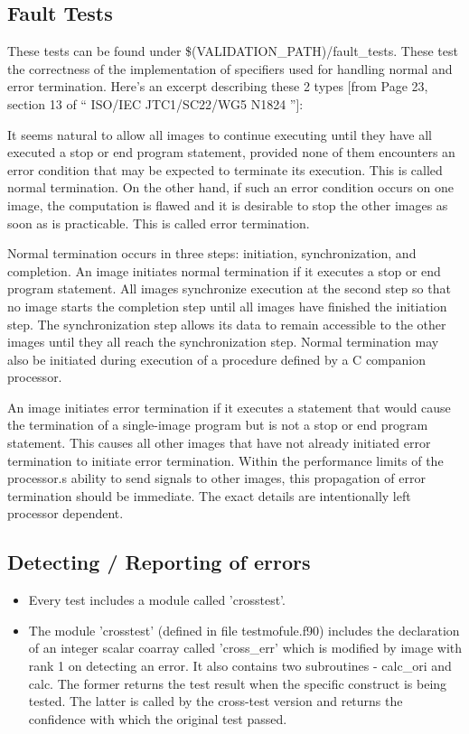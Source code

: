 \subsection{Fault Tests}

These tests can be found under \$(VALIDATION\_PATH)/fault\_tests.
These test the correctness of the implementation of specifiers
used for handling normal and error termination. Here's an
excerpt describing these 2 types [from Page 23, section 13 of
`` ISO/IEC JTC1/SC22/WG5 N1824 ''\cite{Numrich:2005:CNF}]:

{\small  It seems natural to allow all images to continue
executing until they have all executed a stop or end program
statement, provided
  none of them encounters an error condition that may be
expected to terminate its execution. This is called normal
termination.
  On the other hand, if such an error condition occurs on one
image, the computation is flawed and it is desirable to stop
  the other images as soon as is practicable. This is called
error termination.

Normal termination occurs in three steps: initiation,
synchronization, and completion. An image
  initiates normal termination if it executes a stop or end
program statement. All images synchronize execution at the
  second step so that no image starts the completion step until
all images have finished the initiation step. The
  synchronization step allows its data to remain accessible to
the other images until they all reach the synchronization step.
  Normal termination may also be initiated during execution of a
procedure defined by a C companion processor.
}

An image initiates error termination if it executes a
statement that
  would cause the termination of a single-image program but is
not a stop or end program statement. This causes all other
  images that have not already initiated error termination to
initiate error termination. Within the performance limits of
  the processor.s ability to send signals to other images, this
propagation of error termination should be immediate. The
  exact details are intentionally left processor dependent.


\subsection{Detecting / Reporting of errors}

\begin{itemize}
\item Every test includes a module called 'crosstest'.
\item The module 'crosstest' (defined in file testmofule.f90)
includes the declaration of an integer scalar coarray called
'cross\_err' which is modified by image with rank 1 on detecting
an error. It also contains two subroutines - calc\_ori and calc.
The former returns the test result when the specific construct
is being tested. The latter is called by the cross-test version
and returns the confidence with which the original test passed.
\end{itemize}

